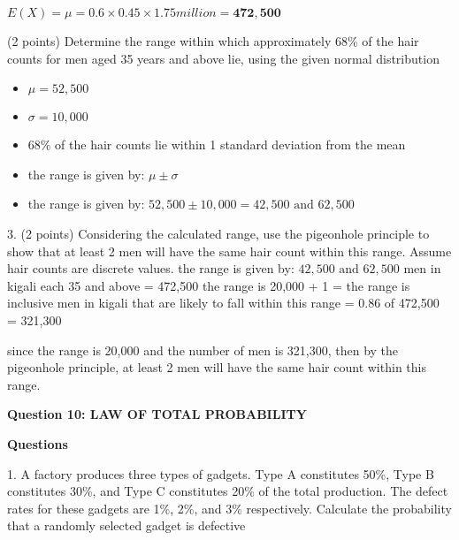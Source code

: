 \documentclass{article}
\begin{document}
\(E(X) = \mu = 0.6 \times 0.45 \times 1.75 million = \mathbf{472,500}\) \newline

(2 points) Determine the range within which approximately 68\% of the hair counts for men aged 35 years and above lie, using the given normal distribution

\begin{itemize}
    \item \(\mu = 52,500\)
    \item \(\sigma = 10,000\)
    \item 68\% of the hair counts lie within 1 standard deviation from the mean
    \item the range is given by: \(\mu \pm \sigma\)
    \item the range is given by: \(52,500 \pm 10,000 = 42,500 \text{ and } 62,500\)
\end{itemize}

3. (2 points) Considering the calculated range, use the pigeonhole principle to show that at
least 2 men will have the same hair count within this range. Assume hair counts are discrete
values.\newline\newline
the range is given by: \(42,500 \text{ and } 62,500\)\newline
men in kigali each 35 and above = 472,500\newline
the range is 20,000 + 1 = the range is inclusive\newline
men in kigali that are likely to fall within this range = 0.86 of 472,500 = 321,300\newline

since the range is 20,000 and the number of men is 321,300, then by the pigeonhole principle, at least 2 men will have the same hair count within this range.\newline




\begin{center}
    \large \textbf{Question 10: LAW OF TOTAL PROBABILITY}
\end{center}

\textbf{Questions}

1. A factory produces three types of gadgets. Type A constitutes 50\%, Type B constitutes 30\%, and Type C constitutes 20\% of the total production. The defect rates for these gadgets are 1\%, 2\%, and 3\% respectively. Calculate the probability that a randomly selected gadget is defective
\end{document}
